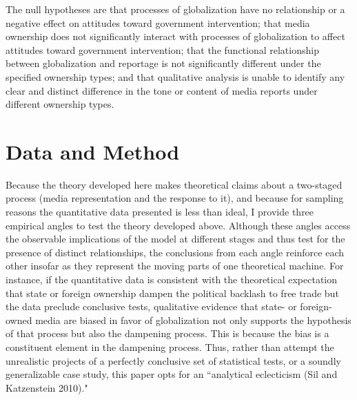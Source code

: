\documentclass[12pt]{report}
\begin{document}
The null hypotheses are that processes of globalization have no relationship or a negative effect on
attitudes toward government intervention; that media ownership does not significantly interact with
processes of globalization to affect attitudes toward government intervention; that the functional
relationship between globalization and reportage is not significantly different under the specified
ownership types; and that qualitative analysis is unable to identify any clear and distinct
difference in the tone or content of media reports under different ownership types.

\section{Data and Method}

Because the theory developed here makes theoretical claims about a two-staged process (media
representation and the response to it), and because for sampling reasons the quantitative data
presented is less than ideal, I provide three empirical angles to test the theory developed above.
Although these angles access the observable implications of the model at different stages and thus
test for the presence of distinct relationships, the conclusions from each angle reinforce each
other insofar as they represent the moving parts of one theoretical machine. For instance, if the
quantitative data is consistent with the theoretical expectation that state or foreign ownership
dampen the political backlash to free trade but the data preclude conclusive tests, qualitative
evidence that state- or foreign-owned media are biased in favor of globalization not only supports
the hypothesis of that process but also the dampening process. This is because the bias is a
constituent element in the dampening process. Thus, rather than attempt the unrealistic projects of
a perfectly conclusive set of statistical tests, or a soundly generalizable case study, this paper
opts for an ``analytical eclecticism (Sil and Katzenstein 2010)."
\end{document}
